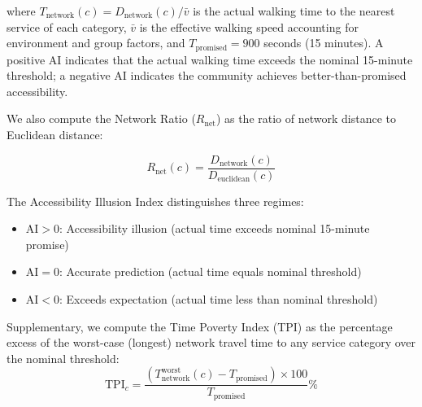 \documentclass[10pt,conference,compsoc]{IEEEtran}
\begin{document}
where $T_{\text{network}}(c) = D_{\text{network}}(c) / \bar{v}$ is the actual walking time to the nearest service of each category, $\bar{v}$ is the effective walking speed accounting for environment and group factors, and $T_{\text{promised}} = 900$ seconds (15 minutes). A positive AI indicates that the actual walking time exceeds the nominal 15-minute threshold; a negative AI indicates the community achieves better-than-promised accessibility.

We also compute the Network Ratio ($R_{\text{net}}$) as the ratio of network distance to Euclidean distance:

\begin{equation}
R_{\text{net}}(c) = \frac{D_{\text{network}}(c)}{D_{\text{euclidean}}(c)}
\label{eq:network_ratio}
\end{equation}

The Accessibility Illusion Index distinguishes three regimes:
\begin{itemize}
    \item \textbf{$\text{AI} > 0$}: Accessibility illusion (actual time exceeds nominal 15-minute promise)
    \item \textbf{$\text{AI} = 0$}: Accurate prediction (actual time equals nominal threshold)
    \item \textbf{$\text{AI} < 0$}: Exceeds expectation (actual time less than nominal threshold)
\end{itemize}

Supplementary, we compute the Time Poverty Index (TPI) as the percentage excess of the worst-case (longest) network travel time to any service category over the nominal threshold:
\begin{equation}
\text{TPI}_c = \frac{(T_{\text{network}}^{\text{worst}}(c) - T_{\text{promised}}) \times 100}{T_{\text{promised}}}\%
\end{equation}
\end{document}
